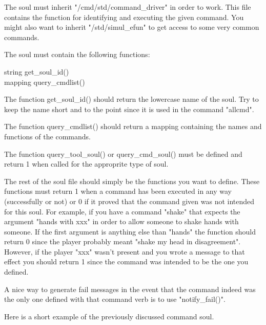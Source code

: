 The soul must inherit "/cmd/std/command\_driver" in order to work. This
file contains the function for identifying and executing the given
command. You might also want to inherit "/std/simul\_efun" to get
access to some very common commands.

The soul must contain the following functions:

string get\_soul\_id() \\
mapping query\_cmdlist()

The function get\_soul\_id() should return the lowercase name of the
soul. Try to keep the name short and to the point since it is used in
the command "allcmd".

The function query\_cmdlist() should return a mapping containing the names
and functions of the commands. 

The function query\_tool\_soul() or query\_cmd\_soul() must be defined
and return 1 when called for the approprite type of soul.

The rest of the soul file should simply be the functions you want to
define. These functions must return 1 when a command has been executed
in any way (successfully or not) or 0 if it proved that the command
given was not intended for this soul. For example, if you have a
command "shake" that expects the argument "hands with xxx" in order to
allow someone to shake hands with someone. If the first argument is
anything else than "hands" the function should return 0 since the
player probably meant "shake my head in disagreement". However, if the
player "xxx" wasn't present and you wrote a message to that effect you
should return 1 since the command was intended to be the one you
defined.

A nice way to generate fail messages in the event that the command
indeed was the only one defined with that command verb is to use
"notify\_fail()".

Here is a short example of the previously discussed command soul.

